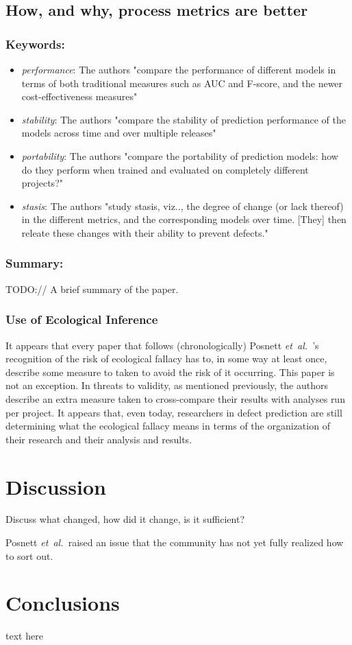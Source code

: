 \documentclass{sig-alternate-05-2015}
\newcommand{\etal}{\mbox{\emph{et al.\ }}}
\begin{document}
\subsection{How, and why, process metrics are better \cite{Rahman:2013}}

\subsubsection{Keywords:}
\begin{itemize}
\item \emph{performance}: The authors "compare the performance of different models in terms of both traditional measures such as AUC and F-score, and the newer cost-effectiveness measures"
\item \emph{stability}: The authors "compare the stability of prediction performance of the models across time and over multiple releases"
\item \emph{portability}: The authors "compare the portability of prediction models: how do they perform when trained and evaluated on completely different projects?"
\item \emph{stasis}: The authors "study stasis, viz.., the degree of change (or lack thereof) in the different metrics, and the corresponding models over time. [They] then releate these changes with their ability to prevent defects."
\end{itemize} 

\subsubsection{Summary:}
TODO:// A brief summary of the paper.

\subsubsection{Use of Ecological Inference}
It appears that every paper that follows (chronologically) Posnett \etal's recognition of the risk of ecological fallacy has to, in some way at least once, describe some measure to taken to avoid the risk of it occurring. This paper is not an exception. In threats to validity, as mentioned previously, the authors describe an extra measure taken to cross-compare their results with analyses run per project. It appears that, even today, researchers in defect prediction are still determining what the ecological fallacy means in terms of the organization of their research and their analysis and results.

\section{Discussion}
Discuss what changed, how did it change, is it sufficient?

Posnett \etal raised an issue that the community has not yet fully realized how to sort out.  

\section{Conclusions}
text here




\end{document}
